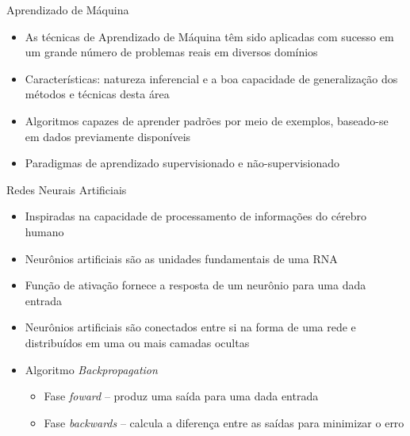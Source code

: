 

\begin{frame}{Aprendizado de Máquina}
\begin{itemize}
	\item As técnicas de \alert{Aprendizado de Máquina} têm sido aplicadas com sucesso em um grande número de problemas reais em diversos domínios
	\bigskip
	\item Características: natureza inferencial e a boa capacidade de generalização dos métodos e técnicas desta área
	\bigskip
	\item Algoritmos capazes de aprender padrões por meio de exemplos, baseado-se em dados previamente disponíveis
	\bigskip
	\item Paradigmas de aprendizado supervisionado e não-supervisionado
\end{itemize}
\end{frame}

\begin{frame}{Redes Neurais Artificiais}
  \baselineskip
	\begin{itemize}
		\item Inspiradas na capacidade de processamento de informações do cérebro humano
		\bigskip
		\item \alert{Neurônios artificiais} são as unidades fundamentais de uma RNA
		\item \alert{Função de ativação} fornece a resposta de um neurônio para uma dada entrada
		\bigskip
		\item Neurônios artificiais são conectados entre si na forma de uma rede e distribuídos em uma ou mais camadas ocultas
		\bigskip
		\item Algoritmo \emph{Backpropagation}
		\begin{itemize}
			\footnotesize
			\item Fase \emph{foward} -- produz uma saída para uma dada entrada
			\item Fase \emph{backwards} -- calcula a diferença entre as saídas para minimizar o erro
		\end{itemize}
	\end{itemize}
\end{frame}

